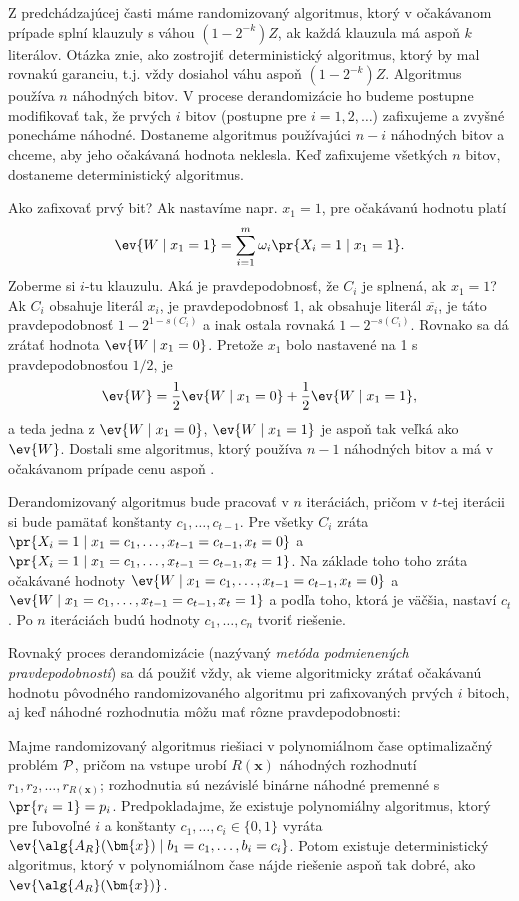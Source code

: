 \noindent
Z predchádzajúcej časti máme randomizovaný algoritmus, ktorý v očakávanom prípade splní klauzuly
s váhou
$(1-2^{-k})Z$, ak každá klauzula má aspoň $k$ literálov. Otázka znie, ako zostrojiť deterministický algoritmus,
ktorý by mal rovnakú garanciu, t.j. vždy dosiahol váhu aspoň $(1-2^{-k})Z$. 
Algoritmus  používa $n$ náhodných bitov. V procese derandomizácie ho budeme postupne modifikovať
tak, že prvých $i$ bitov (postupne pre $i=1,2,\ldots$) zafixujeme a zvyšné ponecháme náhodné.
Dostaneme algoritmus používajúci $n-i$ náhodných bitov a chceme, aby jeho očakávaná hodnota neklesla.
Keď zafixujeme
všetkých $n$ bitov, dostaneme deterministický algoritmus.

\noindent
Ako zafixovať prvý bit? 
Ak nastavíme napr. $x_1=1$, pre očakávanú hodnotu platí
$$\ev{W\mid x_1=1}=\sum_{i=1}^m\omega_i\pr{X_i=1\mid x_1=1}.$$
Zoberme si $i$-tu klauzulu. Aká je pravdepodobnosť, že $C_i$ je splnená, ak $x_1=1$? Ak $C_i$
obsahuje literál $x_i$, je pravdepodobnosť 1, ak obsahuje literál $\overline{x_i}$, je táto
pravdepodobnosť $1-2^{1-s(C_i)}$ a inak ostala rovnaká $1-2^{-s(C_i)}$.
Rovnako sa dá zrátať hodnota $\ev{W\mid x_1=0}$. Pretože $x_1$ bolo nastavené na 1 s pravdepodobnosťou $1/2$,
je
$$\ev{W} = \frac{1}{2}\ev{W\mid x_1=0} + \frac{1}{2}\ev{W\mid x_1=1},$$
a teda jedna z $\ev{W\mid x_1=0}$, $\ev{W\mid x_1=1}$ je aspoň tak veľká ako $\ev{W}$.
Dostali sme algoritmus, ktorý používa $n-1$ náhodných bitov a má v očakávanom
prípade cenu aspoň .


\noindent
Derandomizovaný algoritmus  bude pracovať v $n$ iteráciách, pričom v $t$-tej iterácii 
si bude pamätať konštanty $c_1,\ldots,c_{t-1}$. Pre všetky $C_i$ zráta 
$\pr{X_i=1\mid x_1=c_1,\ldots,x_{t-1}=c_{t-1},x_t=0}$ a
$\pr{X_i=1\mid x_1=c_1,\ldots,x_{t-1}=c_{t-1},x_t=1}$. Na základe toho  toho zráta očakávané hodnoty
$\ev{W\mid x_1=c_1,\ldots,x_{t-1}=c_{t-1},x_t=0}$
a $\ev{W\mid x_1=c_1,\ldots,x_{t-1}=c_{t-1},x_t=1}$ a podľa toho, ktorá je väčšia, nastaví $c_t$.
Po $n$ iteráciách budú hodnoty $c_1,\ldots,c_n$ tvoriť riešenie.

\noindent
Rovnaký proces derandomizácie (nazývaný {\em metóda podmienených pravdepodobností}) sa dá použiť
vždy, ak vieme algoritmicky zrátať očakávanú hodnotu pôvodného randomizovaného algoritmu
pri zafixovaných prvých $i$ bitoch, aj keď náhodné rozhodnutia môžu mať rôzne pravdepodobnosti:

\begin{veta}
\label{thm:derandom}
Majme randomizovaný algoritmus  riešiaci v polynomiálnom čase optimalizačný problém ${\cal P}$, pričom
na vstupe  urobí $R(\bm{x})$ 
náhodných rozhodnutí $r_1,r_2,\ldots,r_{R(\bm{x})}$;
rozhodnutia sú nezávislé binárne náhodné premenné s $\pr{r_i=1}=p_i$. 
Predpokladajme, že existuje polynomiálny algoritmus,
ktorý pre ľubovoľné $i$ a konštanty $c_1,\ldots,c_i\in\{0,1\}$
vyráta $\ev{\alg{A_R}(\bm{x})\mid b_1=c_1,\ldots,b_i=c_i}$. Potom existuje deterministický algoritmus,
ktorý v polynomiálnom čase nájde riešenie aspoň tak dobré, ako $\ev{\alg{A_R}(\bm{x})}$.
\end{veta}


